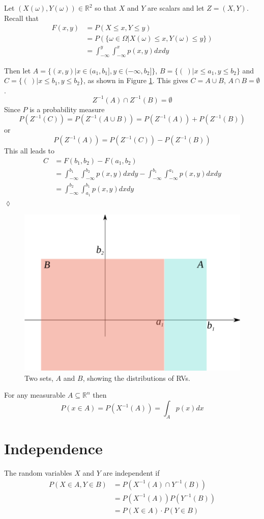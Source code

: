 \begin{example}
Let $(X(\omega),Y(\omega)) \in \mathbb{R}^2$ so that $X$ and $Y$ are scalars and let $Z=(X,Y)$. Recall that
\begin{align*}
F(x,y) &= P(X\leq x, Y\leq y) \\
&= P(\lbrace \omega\in\Omega | X(\omega)\leq x, Y(\omega)\leq y\rbrace) \\
&= \int_{-\infty}^y\int_{-\infty}^x p(x,y)dxdy
\end{align*}

Then let $A=\lbrace(x,y) | x\in(a_1,b_1], y\in(-\infty,b_2]\rbrace$, $B=\lbrace(~) | x\leq a_1, y\leq b_2\rbrace$ and $C=\lbrace(~)|x\leq b_1, y\leq b_2\rbrace$, as shown in Figure \ref{fig:02twoSets}. This gives $C=A\cup B$, $A\cap B=\emptyset$.
$$Z^{-1}(A)\cap Z^{-1}(B) = \emptyset$$
Since $P$ is a probability measure
$$P(Z^{-1}(C)) = P(Z^{-1}(A\cup B)) = P(Z^{-1}(A))+P(Z^{-1}(B))$$
or
$$P(Z^{-1}(A))=P(Z^{-1}(C))-P(Z^{-1}(B))$$
This all leads to
\begin{align*}
C &= F(b_1,b_2) - F(a_1,b_2) \\
&= \int_{-\infty}^{b_1}\int_{-\infty}^{b_2} p(x,y)dxdy - \int_{-\infty}^{b_1}\int_{-\infty}^{a_1}p(x,y)dxdy \\
&= \int_{-\infty}^{b_2}\int_{a_1}^{b_1} p(x,y)dxdy
\end{align*}
$\lozenge$
\end{example}

\begin{figure}[ht!]
	\centering
	\includegraphics[width=.35\textwidth]{images/02twoSets}
	\caption{Two sets, $A$ and $B$, showing the distributions of RVs.}
	\label{fig:02twoSets}
\end{figure}

\begin{theorem}
For any measurable $A\subseteq\mathbb{R}^n$ then
$$P(x\in A)=P(X^{-1}(A)) = \int_Ap(x)dx$$
\end{theorem}

\section{Independence}
\begin{definition}
The random variables $X$ and $Y$ are independent if
\begin{align*}
P(X\in A, Y\in B) &= P(X^{-1}(A) \cap Y^{-1}(B)) \\
&= P(X^{-1}(A)) P(Y^{-1}(B)) \\
&= P(X\in A) \cdot P(Y\in B)
\end{align*}
\end{definition}

